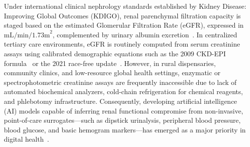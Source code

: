 \documentclass[conference]{IEEEtran}
\begin{document}
Under international clinical nephrology standards established by Kidney Disease: Improving Global Outcomes (KDIGO), renal parenchymal filtration capacity is staged based on the estimated Glomerular Filtration Rate (eGFR), expressed in $\text{mL/min/1.73m}^2$, complemented by urinary albumin excretion~\cite{kdigo2013, levey2009new}. In centralized tertiary care environments, eGFR is routinely computed from serum creatinine assays using calibrated demographic equations such as the 2009 CKD-EPI formula~\cite{levey2009new} or the 2021 race-free update~\cite{inker2021new}. However, in rural dispensaries, community clinics, and low-resource global health settings, enzymatic or spectrophotometric creatinine assays are frequently inaccessible due to lack of automated biochemical analyzers, cold-chain refrigeration for chemical reagents, and phlebotomy infrastructure. Consequently, developing artificial intelligence (AI) models capable of inferring renal functional compromise from non-invasive, point-of-care surrogates—such as dipstick urinalysis, peripheral blood pressure, blood glucose, and basic hemogram markers—has emerged as a major priority in digital health~\cite{chen2020machine, aljaaf2018predicting}.
\end{document}
